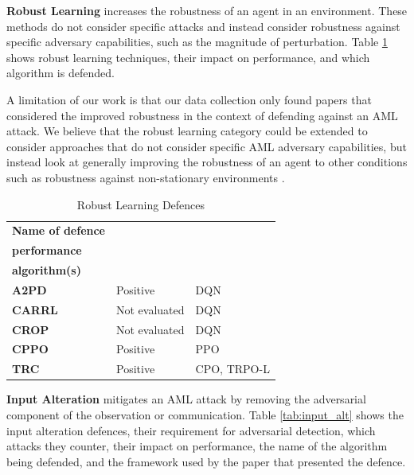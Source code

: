 \documentclass[conference,compsoc]{IEEEtran}
\begin{document}
\noindent \textbf{Robust Learning}
increases the robustness of an agent in an environment. These methods do not consider specific attacks and instead consider robustness against specific adversary capabilities, such as the magnitude of perturbation. Table \ref{tab:rob_learn} shows robust learning techniques, their impact on performance, and which algorithm is defended.

A limitation of our work is that our data collection only found papers that considered the improved robustness in the context of defending against an AML attack. We believe that the robust learning category could be extended to consider approaches that do not consider specific AML adversary capabilities, but instead look at generally improving the robustness of an agent to other conditions such as robustness against non-stationary environments \cite{lecarpentier_non-stationary_2019}.


\begin{table}[ht]
\centering
\caption{Robust Learning Defences}
\begin{tabular}{lll} 
\hline
\textbf{Name of defence}                        & \makecell[lt]{\textbf{Impact on} \\ \textbf{performance}} & \makecell[lt]{\textbf{Defended} \\ \textbf{algorithm(s)}}  \\ 
\hline
\textbf{A2PD \cite{qu_adversary_2021}} & Positive                       & DQN                         \\ 
\textbf{CARRL \cite{everett_certifiable_2021}}                                  & Not evaluated                  & DQN                         \\ 
\textbf{CROP \cite{wu_crop_2022}}                                   & Not evaluated                  & DQN                         \\ 
\textbf{CPPO \cite{ying_towards_2021}}                                   & Positive                       & PPO                         \\ 
\textbf{TRC \cite{kim_trc_2022}}                                    & Positive                       & CPO, TRPO-L                 \\
\hline
\end{tabular}
\label{tab:rob_learn}
\end{table}

\noindent \textbf{Input Alteration}
mitigates an AML attack by removing the adversarial component of the observation or communication. Table \ref{tab:input_alt} shows the input alteration defences, their requirement for adversarial detection, which attacks they counter, their impact on performance, the name of the algorithm being defended, and the framework used by the paper that presented the defence. 
\end{document}

